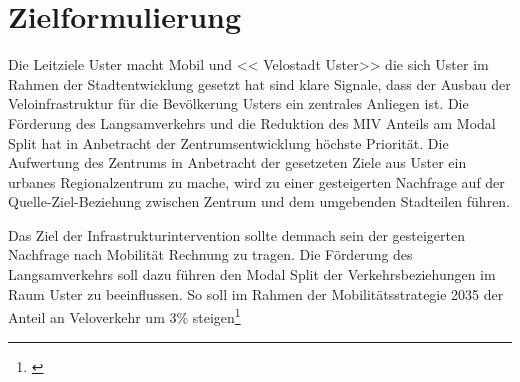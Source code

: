 %
%
%
%

\chapter{Zielformulierung}
\label{chap:Ziel}

Die Leitziele \guillemotleft Uster macht Mobil \guillemotright und << Velostadt Uster>> die sich Uster im Rahmen der Stadtentwicklung gesetzt hat sind klare Signale, dass der Ausbau der Veloinfrastruktur für die Bevölkerung Usters ein zentrales Anliegen ist. Die Förderung des Langsamverkehrs und die Reduktion des MIV Anteils am Modal Split hat in Anbetracht der Zentrumsentwicklung höchste Priorität. Die Aufwertung des Zentrums in Anbetracht der gesetzeten Ziele aus Uster ein urbanes Regionalzentrum zu mache, wird zu einer gesteigerten Nachfrage auf der Quelle-Ziel-Beziehung zwischen Zentrum und dem umgebenden Stadteilen führen.

Das Ziel der Infrastrukturintervention sollte demnach sein der gesteigerten Nachfrage nach Mobilität Rechnung zu tragen. Die Förderung des Langsamverkehrs soll dazu führen den Modal Split der Verkehrsbeziehungen im Raum Uster zu beeinflussen. So soll im Rahmen der Mobilitätsstrategie 2035 der Anteil an Veloverkehr um 3\% steigen\footnote{\cite{STEK Kap.7}}



%

